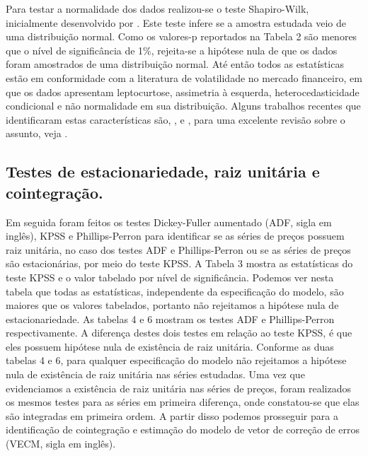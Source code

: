 Para testar a normalidade dos dados realizou-se o teste Shapiro-Wilk,
inicialmente desenvolvido por . Este teste infere
se a amostra estudada veio de uma distribuição normal. Como os valores-p
reportados na Tabela 2 são menores que o nível de significância de 1\%,
rejeita-se a hipótese nula de que os dados foram amostrados de uma
distribuição normal. Até então todos as estatísticas estão em
conformidade com a literatura de volatilidade no mercado financeiro, em
que os dados apresentam leptocurtose, assimetria à esquerda,
heterocedasticidade condicional e não normalidade em sua distribuição.
Alguns trabalhos recentes que identificaram estas características são,
,  e , para uma excelente revisão sobre o assunto, veja .

\subsection{Testes de estacionariedade, raiz unitária e
cointegração.}\label{testes-de-estacionariedade-raiz-unitaria-e-cointegracao.}

Em seguida foram feitos os testes Dickey-Fuller aumentado (ADF, sigla em
inglês), KPSS e Phillips-Perron para identificar se as séries de preços
possuem raiz unitária, no caso dos testes ADF e Phillips-Perron ou se as
séries de preços são estacionárias, por meio do teste KPSS. A Tabela 3
mostra as estatísticas do teste KPSS e o valor tabelado por nível de
significância. Podemos ver nesta tabela que todas as estatísticas,
independente da especificação do modelo, são maiores que os valores
tabelados, portanto não rejeitamos a hipótese nula de estacionariedade.
As tabelas 4 e 6 mostram os testes ADF e Phillips-Perron
respectivamente. A diferença destes dois testes em relação ao teste
KPSS, é que eles possuem hipótese nula de existência de raiz unitária.
Conforme as duas tabelas 4 e 6, para qualquer especificação do modelo não
rejeitamos a hipótese nula de existência de raiz unitária nas séries
estudadas. Uma vez que evidenciamos a existência de raiz unitária nas
séries de preços, foram realizados os mesmos testes para as séries em
primeira diferença, onde constatou-se que elas são integradas em
primeira ordem. A partir disso podemos prosseguir para a identificação
de cointegração e estimação do modelo de vetor de correção de erros
(VECM, sigla em inglês).

